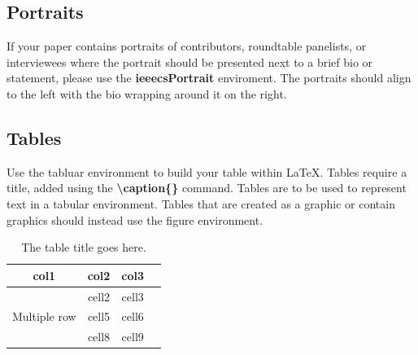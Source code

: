 \documentclass[hasAbstract,authorBox]{csmagazine}
\begin{document}

\subsection{Portraits}

If your paper contains portraits of contributors, roundtable panelists, or interviewees where the portrait should be presented next to a brief bio or statement, please use the \textbf{ieeecsPortrait} enviroment. The portraits should align to the left with the bio wrapping around it on the right.


\vspace{7em}


\subsection{Tables}

Use the tabluar environment to build your table within \LaTeX. Tables require a title, added using the \textbf{\textbackslash{}caption\{\}} command. Tables are to be used to represent text in a tabular environment. Tables that are created as a graphic or contain graphics should instead use the figure environment.



\begin{table}[H]
	\begin{center}
		\caption{The table title goes here.}
		\begin{tabular}{ |c|c|c|c| } 
			\hline
			col1 & col2 & col3 \\
			\hline
			\multirow{3}{4em}{Multiple row} & cell2 & cell3 \\ 
			& cell5 & cell6 \\ 
			& cell8 & cell9 \\ 
			\hline
		\end{tabular}
	\end{center}
\end{table}
\end{document}
